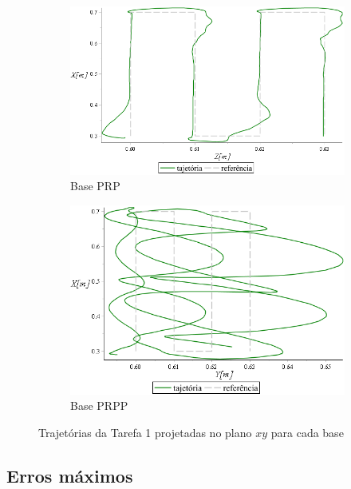 \begin{figure}[h]
    \begin{subfigure}[b]{0.48\textwidth}
        \includegraphics[width=\textwidth]{figs/t2_traj_base_prp}
        \caption{Base PRP}
        \label{fig::t2_traj_base_prp}
    \end{subfigure}
    \quad %
    \begin{subfigure}[b]{0.48\textwidth}
        \includegraphics[width=\textwidth]{figs/t2_traj_base_prpp}
        \caption{Base PRPP}
        \label{fig::t2_traj_base_prpp}
    \end{subfigure}
    \caption{Trajetórias da Tarefa 1 projetadas no plano $xy$ para cada base}
    \label{fig::res_traj2}
\end{figure}


\subsection{Erros máximos}

